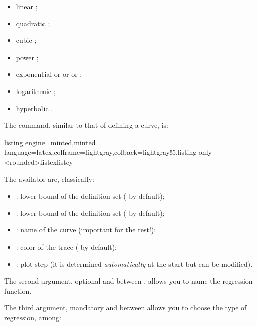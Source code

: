 \documentclass[11pt,a4paper]{ltxdoc}
\begin{document}
\begin{itemize}
	\item linear ;
	\item quadratic ;
	\item cubic ;
	\item power ;
	\item exponential  or  or  or ;
	\item logarithmic ;
	\item hyperbolic  .
\end{itemize}

The command, similar to that of defining a curve, is:

\begin{tcblisting}{listing engine=minted,minted language=latex,colframe=lightgray,colback=lightgray!5,listing only}
<rounded>{listex}{listey}
\end{tcblisting}

The \MontreCode{[keys]} available are, classically:

\begin{itemize}
	\item {}: lower bound of the definition set ( by default);
	\item {}: lower bound of the definition set ( by default);
	\item {}: name of the curve (important for the rest!);
	\item {}: color of the trace ( by default);
	\item {}: plot step (it is determined \textit{automatically} at the start but can be modified).
\end{itemize}

\pagebreak

The second argument, optional and between , allows you to name the regression function.

The third argument, mandatory and between  allows you to choose the type of regression, among:
\end{document}
